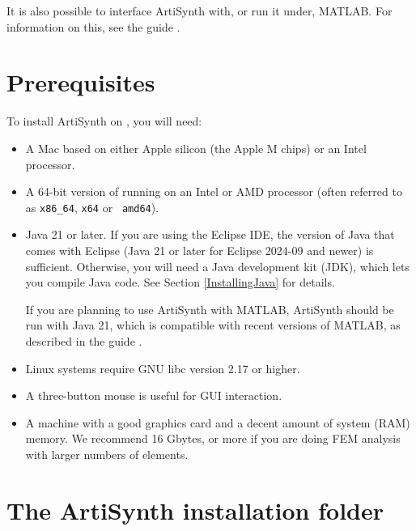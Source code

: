 It is also possible to interface ArtiSynth with, or run it under,
MATLAB. For information on this, see the guide
.

\section{Prerequisites}
\label{Prerequisites}

To install ArtiSynth on \SYSTEM{}, you will need:

\begin{itemize}

\ifMacOS
\item A Mac based on either Apple silicon (the Apple M chips) or an
Intel processor.
\else
\item A 64-bit version of \SYSTEM{} running on an Intel or AMD
processor (often referred to as {\tt x86\_64}, {\tt x64} or {\tt
amd64}).
\fi

\item Java 21 or later. If you are using the Eclipse IDE, the version
of Java that comes with Eclipse (Java 21 or later for Eclipse 2024-09
and newer) is sufficient. Otherwise, you will need a Java development
kit (JDK), which lets you compile Java code. See Section
\ref{InstallingJava} for details.

\begin{sideblock}
If you are planning to use ArtiSynth with MATLAB, ArtiSynth should be
run with Java 21, which is compatible with recent versions of MATLAB,
as described in the guide
.
\end{sideblock}

\ifLinux
\item Linux systems require GNU libc version 2.17 or higher.
\fi

\item A three-button mouse is useful for GUI interaction.

\item A machine with a good graphics card and a decent amount of
system (RAM) memory. We recommend 16 Gbytes, or more if you are doing
FEM analysis with larger numbers of elements.

\end{itemize}

\section{The ArtiSynth installation folder}
\label{FileConventions}

